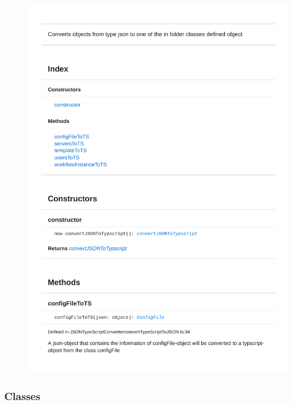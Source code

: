 \begin{figure}[H]
\centerline{\includegraphics[width=1\textwidth]{FrontendDocsAsPDF/JSONTypeSriptConverter/convertTypeScriptToJSON.pdf}}
\end{figure}

\subsubsection{Classes}

